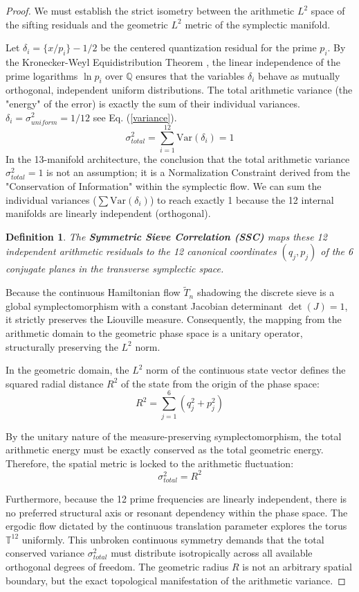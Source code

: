 \documentclass[sn-mathphys-num, pdflatex]{sn-jnl}
\newtheorem{definition}[theorem]{Definition}
\begin{document}
\begin{proof}
We must establish the strict isometry between the arithmetic $L^2$ space of the sifting residuals and the geometric $L^2$ metric of the symplectic manifold. 

Let $\delta_i = \{x/p_i\} - 1/2$ be the centered quantization residual for the prime $p_i$. By the Kronecker-Weyl Equidistribution Theorem \cite{weyl}, the linear independence of the prime logarithms $\ln p_i$ over $\mathbb{Q}$ ensures that the variables $\delta_i$ behave as mutually orthogonal, independent uniform distributions. The total arithmetic variance (the "energy" of the error) is exactly the sum of their individual variances. $\delta_i=\sigma^2_{uniform}=1/12$ see Eq. (\ref{variance}).
$$ \sigma_{total}^2 = \sum_{i=1}^{12} \text{Var}(\delta_i) = 1 $$ 
In the 13-manifold architecture, the conclusion that the total arithmetic variance $\sigma_{total}^2 = 1$ is not an assumption; it is a Normalization Constraint derived from the "Conservation of Information" within the symplectic flow. We can sum the individual variances ($\sum \text{Var}(\delta_i)$) to reach exactly 1 because the 12 internal manifolds are linearly independent (orthogonal).

\begin{definition}  
\label{SSC}
 The \textbf{Symmetric Sieve Correlation (SSC)} maps these 12 independent arithmetic residuals to the 12 canonical coordinates $(q_j, p_j)$ of the 6 conjugate planes in the transverse symplectic space. 
 \end{definition}
 Because the continuous Hamiltonian flow $\tilde{T}_n$ shadowing the discrete sieve is a global symplectomorphism with a constant Jacobian determinant $\det(J) = 1$, it strictly preserves the Liouville measure. Consequently, the mapping from the arithmetic domain to the geometric phase space is a unitary operator, structurally preserving the $L^2$ norm.

In the geometric domain, the $L^2$ norm of the continuous state vector defines the squared radial distance $R^2$ of the state from the origin of the phase space:
$$ R^2 = \sum_{j=1}^{6} (q_j^2 + p_j^2) $$

By the unitary nature of the measure-preserving symplectomorphism, the total arithmetic energy must be exactly conserved as the total geometric energy. Therefore, the spatial metric is locked to the arithmetic fluctuation:
$$ \sigma_{total}^2 = R^2 $$

Furthermore, because the 12 prime frequencies are linearly independent, there is no preferred structural axis or resonant dependency within the phase space. The ergodic flow dictated by the continuous translation parameter explores the torus $\mathbb{T}^{12}$ uniformly. This unbroken continuous symmetry demands that the total conserved variance $\sigma_{total}^2$ must distribute isotropically across all available orthogonal degrees of freedom. The geometric radius $R$ is not an arbitrary spatial boundary, but the exact topological manifestation of the arithmetic variance.
\end{proof}
\end{document}
